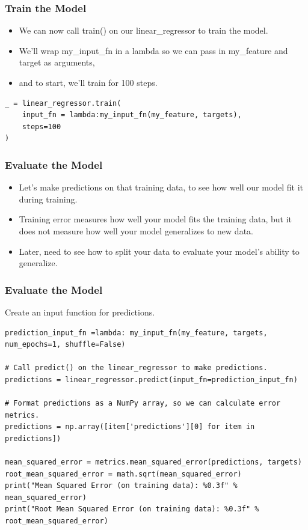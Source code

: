 \begin{frame}[fragile]\frametitle{Train the Model}
\begin{itemize}
\item We can now call train() on our linear\_regressor to train the model. 
\item We'll wrap my\_input\_fn in a lambda so we can pass in my\_feature and target as arguments, 
\item and to start, we'll train for 100 steps.
\end{itemize}

\begin{lstlisting}
_ = linear_regressor.train(
    input_fn = lambda:my_input_fn(my_feature, targets),
    steps=100
)
\end{lstlisting}

\end{frame}

\begin{frame}[fragile]\frametitle{Evaluate the Model}
\begin{itemize}
\item Let's make predictions on that training data, to see how well our model fit it during training.
\item Training error measures how well your model fits the training data, but it does not measure how well your model generalizes to new data. 
\item Later, need to see how to split your data to evaluate your model's ability to generalize.
\end{itemize}
\end{frame}

\begin{frame}[fragile]\frametitle{Evaluate the Model}
 Create an input function for predictions.
\begin{lstlisting}
prediction_input_fn =lambda: my_input_fn(my_feature, targets, num_epochs=1, shuffle=False)

# Call predict() on the linear_regressor to make predictions.
predictions = linear_regressor.predict(input_fn=prediction_input_fn)

# Format predictions as a NumPy array, so we can calculate error metrics.
predictions = np.array([item['predictions'][0] for item in predictions])

mean_squared_error = metrics.mean_squared_error(predictions, targets)
root_mean_squared_error = math.sqrt(mean_squared_error)
print("Mean Squared Error (on training data): %0.3f" % mean_squared_error)
print("Root Mean Squared Error (on training data): %0.3f" % root_mean_squared_error)
\end{lstlisting}

\end{frame}

